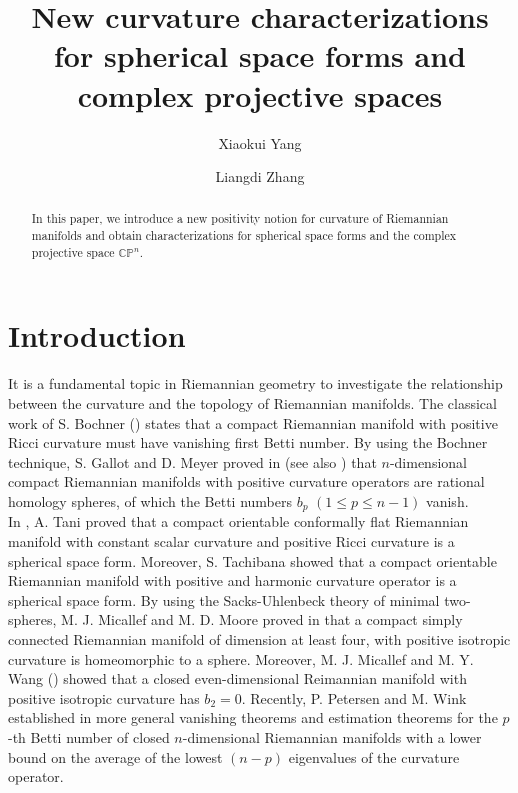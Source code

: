 \documentclass[12pt]{amsart}
\title{New curvature characterizations for spherical space forms and complex projective spaces}
\author{Xiaokui Yang}
\author{Liangdi Zhang}
\theoremstyle{plain}
\theoremstyle{definition}
\renewcommand{\>}{\rightarrow}
\newcommand{\C}{{\mathbb C}}
\renewcommand{\P}{{\mathbb P}}
\numberwithin{equation}{section} %
\begin{document}
	
	\begin{abstract} In this paper, we introduce  a new positivity notion for  curvature  of Riemannian manifolds and obtain characterizations for spherical space forms and the complex projective space $\C\P^n$. 
	\end{abstract}
	
	
	\maketitle
	
	
	\section{Introduction}
	
	
	It is a fundamental topic in Riemannian geometry  to investigate the relationship between the curvature and the topology of Riemannian manifolds.  The classical work of S. Bochner (\cite{Bochner46}) states that a compact Riemannian manifold with positive Ricci curvature must have  vanishing first Betti number. By using the Bochner technique,     S. Gallot and  D. Meyer   proved in  \cite{GM75} (see also \cite{Meyer1971}) that $n$-dimensional compact Riemannian manifolds with positive curvature operators are rational homology spheres, of which the Betti  numbers $b_p$ $(1\leq p\leq n-1)$ vanish.\\

	
	In  \cite{Tani1974}, A. Tani proved that a compact orientable conformally flat Riemannian manifold with constant scalar curvature and positive Ricci curvature is a spherical space form. Moreover, S. Tachibana \cite{Tachibana74} showed that a compact orientable Riemannian manifold with positive and harmonic curvature operator is a spherical space form.  By using  the Sacks-Uhlenbeck theory of minimal two-spheres,
	M. J. Micallef and M. D. Moore proved in  \cite{MicallefMoore1988} that a compact simply connected Riemannian manifold of dimension at least four, with positive isotropic curvature is homeomorphic to a sphere. Moreover, M. J. Micallef and M. Y. Wang (\cite{MicallefWang1993}) showed that a closed even-dimensional Reimannian manifold with positive isotropic curvature  has $b_2=0$.  Recently, P. Petersen and M. Wink  established in \cite{PetersenWink2021a} more general vanishing theorems and estimation theorems for the $p$-th Betti number of closed $n$-dimensional Riemannian manifolds with a lower bound on the average of the lowest $(n-p)$ eigenvalues of the curvature operator.\\
	
\end{document}

